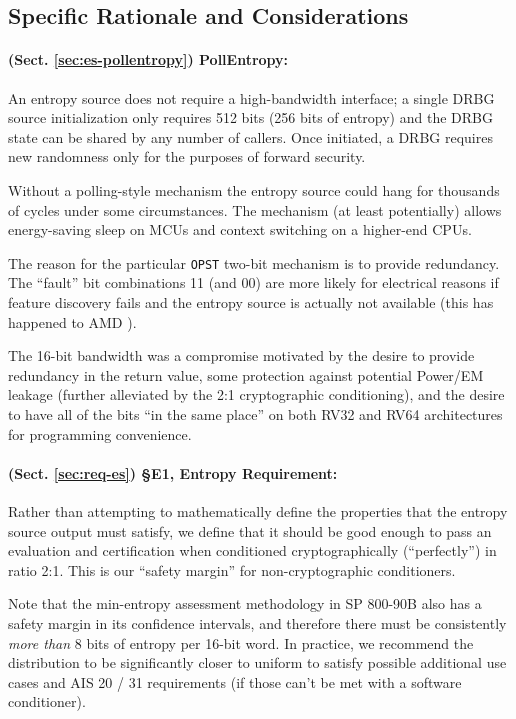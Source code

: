 \subsection{Specific Rationale and Considerations}

    \paragraph{(Sect. \ref{sec:es-pollentropy}) PollEntropy:}
    An entropy source does not require a high-bandwidth interface;
    a single DRBG source initialization only requires 512 bits
    (256 bits of entropy) and the DRBG state can be shared by any number of
    callers. Once initiated, a DRBG requires new randomness only for the
    purposes of forward security.

    Without a polling-style mechanism the entropy source could hang for
    thousands of cycles under some circumstances. The  mechanism
    (at least potentially) allows energy-saving sleep on MCUs and context
    switching on a higher-end CPUs.

    The reason for the particular \verb|OPST| two-bit mechanism is to
    provide redundancy. The ``fault'' bit combinations 11 (and 00) are more
    likely for electrical reasons if feature discovery fails and the entropy
    source is actually not available (this has happened to AMD \cite{Sa19}).

    The 16-bit bandwidth was a compromise motivated by the desire to
    provide redundancy in the return value, some protection against
    potential Power/EM leakage (further alleviated by the 2:1
    cryptographic conditioning), and the desire to have all of the
    bits ``in the same place'' on both RV32 and RV64 architectures for
    programming convenience.

    \paragraph{(Sect. \ref{sec:req-es}) \S E1, Entropy Requirement:}
        Rather than attempting to mathematically define the properties that the
    entropy source output must satisfy, we define that it should be good
    enough to pass an evaluation and certification when conditioned
    cryptographically (``perfectly'') in ratio 2:1. This is our ``safety
    margin'' for non-cryptographic conditioners.

    Note that the min-entropy assessment methodology in SP 800-90B
    \cite{TuBaKe+18} also has a safety margin in its confidence intervals,
    and therefore there must be consistently \emph{more than} 8 bits of
    entropy per 16-bit word. In practice, we recommend the
    distribution to be significantly closer to uniform to satisfy
    possible additional use cases and AIS 20 / 31 \cite{KiSc11}
    requirements (if those can't be met with a software conditioner).

